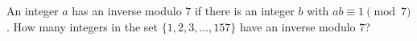 An integer $a$ has an inverse modulo $7$ if there is an integer $b$ with $ab\equiv1\pmod7$. How many integers in the set $\{1,2,3,\dots,157\}$ have an inverse modulo $7$?
